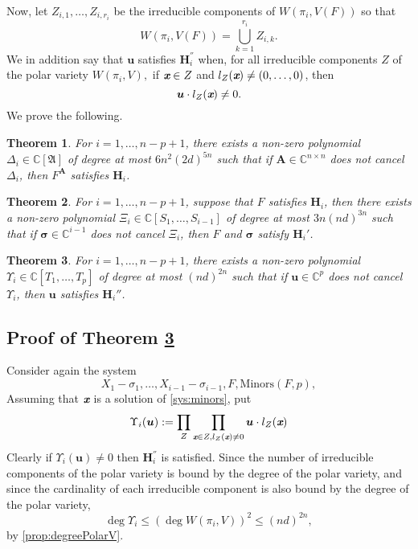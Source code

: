 \documentclass[a4paper]{article}
\def\A{\mathfrak{A}}
\def\mA{{\bm A}}
\def\ub{{\bm u}}
\def\xb{\textit{\textbf{x}}}
\def\D{\Delta}
\def\minors{\textrm{Minors}(F,p)}
\def\C{\mathbb{C}}
\newtheorem{theorem}{Theorem}[section]
\begin{document}
\noindent 
Now, let $Z_{i,1},\hdots,Z_{i,r_i}$ be the irreducible components of $W(\pi_i,V(F))$ so that
\[
W(\pi_i,V(F)) = \bigcup_{k=1}^{r_i} Z_{i,k}.
\]
We in addition say that $\bm u$ satisfies $\textbf{H}_i^{''}$ when, for all irreducible components $Z$ of the polar variety $W(\pi_i,V),$ if $\xb \in Z$ and $l_Z(\xb) \not = (0,\hdots,0)$, then 
\[
\ub \cdot l_Z(\xb) \not = 0.
\]
\noindent 
We prove the following.  
%
\begin{theorem}\label{theo:NoetherPositionG}
  For $i=1,\dots,n-p+1$, there exists a non-zero polynomial $\D_i\in\C[\A]$ of degree at most $6n^2(2d)^{5n}$ such that if $\mA \in
  \C^{n\times n}$ does not cancel $\D_i$, then
  $F^\mA$ satisfies $\textbf{H}_i$.
\end{theorem}
%
\begin{theorem}\label{theo:sigmaG}
  For $i=1,\dots,n-p+1$, suppose that $F$ satisfies $\textbf{H}_i$, then there exists a non-zero
  polynomial $\Xi_{i} \in \C[S_1,\dots,S_{i-1}]$ of degree at most
  $3n(nd)^{3n}$ such that if $\bm \sigma \in \C^{i-1}$ does not
  cancel $\Xi_{i}$, then $F$ and $\bm \sigma$ satisfy $\textbf{H}_i'$.
\end{theorem}
%
\begin{theorem}\label{the:u}
  For $i=1,\dots,n-p+1$, there exists a non-zero
  polynomial $\Upsilon_{i} \in \C[T_1,\dots,T_{p}]$ of degree at most $(nd)^{2n}$ such that if $\bm u \in \C^{p}$ does not
  cancel $\Upsilon_{i}$, then $\bm u$ satisfies $\textbf{H}_i{''}$.
\end{theorem}
%

\subsection{Proof of Theorem \ref{the:u}}
Consider again the system
\begin{equation}\label{sys:minors}
X_1 - \sigma_1,\hdots,X_{i-1} - \sigma_{i-1}, F, \minors , 
\end{equation}
Assuming that $\xb$ is a solution of \ref{sys:minors}, put
\[
\Upsilon_i(\ub) := \prod_Z \prod_{\xb\in Z, l_Z(\xb) \not = 0} \ub \cdot l_Z(\xb)
\]
Clearly if $\Upsilon_i(\ub) \not = 0$ then $\bm H_i^{''}$ is satisfied. Since the number of irreducible components of the polar variety is bound by the degree of the polar variety, and since the cardinality of each irreducible component is also bound by the degree of the polar variety,
\[
\deg \Upsilon_i \leq (\deg W(\pi_i,V))^2 \leq (nd)^{2n},
\]
by \ref{prop:degreePolarV}.
\end{document}
